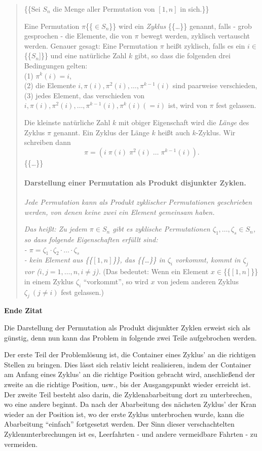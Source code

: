 \begin{quotation}
\{\{Sei $S_n$ die Menge aller Permutation von $[1,n]$ in sich.\}\}

Eine Permutation $\pi$\{\{$\in S_n$\}\} wird ein \emph{Zyklus} \{\{\dots\}\} genannt, falls - grob gesprochen - die Elemente, die von $\pi$ bewegt werden,
zyklisch vertauscht werden. Genauer gesagt: Eine Permutation $\pi$ heißt zyklisch,
falls es ein $i \in $\{\{$S_n$]\}\} und eine natürliche Zahl $k$ gibt, so dass die folgenden drei Bedingungen gelten:\\
(1) $\pi^k(i) = i$, \\
(2) die Elemente $i,\pi(i),\pi^2(i),\dots,\pi^{k-1}(i)$ sind paarweise verschieden, \\
(3) jedes Element, das verschieden von $i,\pi(i),\pi^2(i),\dots,\pi^{k-1}(i), \pi^k(i) (=i)$ ist, wird von $\pi$ fest gelassen.

Die kleinste natürliche Zahl $k$ mit obiger Eigenschaft wird die \emph{Länge} des Zyklus $\pi$ genannt.
Ein Zyklus der Länge $k$ heißt auch $k$-Zyklus. Wir schreiben dann \[\pi=(i\;\pi(i)\;\pi^2(i) \; \dots \;\pi^{k-1}(i)).\]
\{\{\dots\}\}
\paragraph{Darstellung einer Permutation als Produkt disjunkter Zyklen.}
\emph{Jede Permutation kann als Produkt zyklischer Permutationen geschrieben werden, von denen keine zwei ein Element gemeinsam haben.}

\emph{Das heißt: Zu jedem $\pi \in S_n$ gibt es zyklische Permutationen $\zeta_1,\dots,\zeta_s \in S_n$,
so dass folgende Eigenschaften erfüllt sind: \\
 - $\pi=\zeta_1\cdot \zeta_2 \cdot \ldots \cdot \zeta_s$ \\
 - kein Element aus \{\{$[1,n]$\}\}, das \{\{\dots\}\} in $\zeta_i$ vorkommt, kommt in $\zeta_j$ vor ($i,j=1, \dots,n, i \neq j$).}
(Das bedeutet: Wenn ein Element $x \in$\{\{$[1,n]$\}\} in einem Zyklus $\zeta_i$ ``vorkommt'',
 so wird $x$ von jedem anderen Zyklus $\zeta_j \: (j \neq i)$ fest gelassen.)
\end{quotation}
\nopagebreak[4]
\textbf{Ende Zitat}

Die Darstellung der Permutation als Produkt disjunkter Zyklen erweist sich als günstig,
denn nun kann das Problem in folgende zwei Teile aufgebrochen werden.

Der erste Teil der Problemlösung ist, die Container eines Zyklus' an die richtigen Stellen zu bringen.
Dies lässt sich relativ leicht realisieren, indem der Container am Anfang eines Zyklus' an die richtige Position gebracht wird,
anschließend der zweite an die richtige Position, usw., bis der Ausgangspunkt wieder erreicht ist.
Der zweite Teil besteht also darin, die Zyklenabarbeitung dort zu unterbrechen, wo eine andere beginnt.
Da nach der Abarbeitung des nächsten Zyklus' der Kran wieder an der Position ist,
wo der erste Zyklus unterbrochen wurde, kann die Abarbeitung ``einfach'' fortgesetzt werden.
Der Sinn dieser verschachtelten Zyklenunterbrechungen ist es, Leerfahrten - und andere vermeidbare Fahrten - zu vermeiden.

